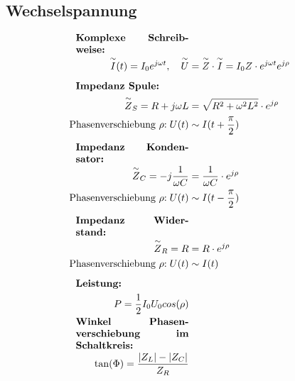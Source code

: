 \subsection{Wechselspannung}
    \vspace{-1em}
    \begin{align*}
        \parbox{4cm}{\textbf{Komplexe Schreibweise:}}\\
        \overset{\sim}{I}(t) = I_0 e^{j \omega t}, \quad \overset{\sim}{U} &= \overset{\sim}{Z} \cdot \overset{\sim}{I} = I_0 Z \cdot e^{j \omega t} e^{j \rho}
        \\[0.5em]
        \parbox{4cm}{\textbf{Impedanz Spule:}}\\
        \overset{\sim}{Z}_S = R + j \omega L &= \sqrt{R^2 + \omega^2 L ^2} \cdot e^{j \rho}\\
        \text{Phasenverschiebung $\rho$:} \; U(t) &\sim I(t + \frac{\pi}{2})
        \\[0.5em]
        \parbox{4cm}{\textbf{Impedanz Kondensator:}}\\
        \overset{\sim}{Z}_C = - j\frac{1}{\omega C} &= \frac{1}{\omega C} \cdot e^{j \rho}\\
        \text{Phasenverschiebung $\rho$:} \; U(t) &\sim I(t - \frac{\pi}{2})
        \\[0.5em]
        \parbox{4cm}{\textbf{Impedanz Widerstand:}}\\
        \overset{\sim}{Z}_R = R &= R \cdot e^{j \rho}\\
        \text{Phasenverschiebung $\rho$:} \; U(t) &\sim I(t)
        \\[0.5em]
        \parbox{4cm}{\textbf{Leistung:}}\\
        P = \frac{1}{2} I_0 U_0 cos(\rho)\\
        \parbox{4cm}{\textbf{Winkel Phasenverschiebung im Schaltkreis:}}\\
        \tan(\Phi) = \frac{|Z_L| - |Z_C|}{Z_R}
    \end{align*}

